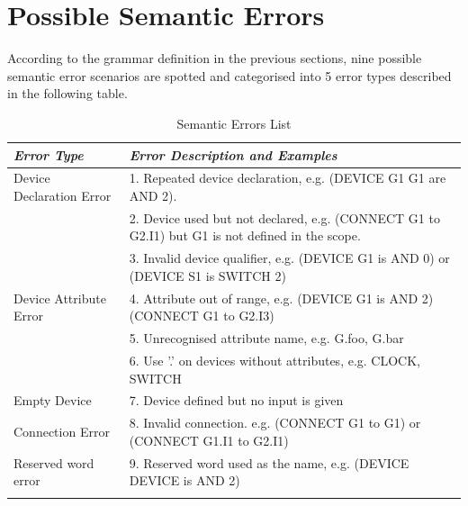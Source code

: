 \documentclass[12pt]{article}
\def\n{\noindent}
\begin{document}
\section{Possible Semantic Errors}
\n According to the grammar definition in the previous sections, nine possible semantic error scenarios are spotted and categorised into 5 error types described in the following table. 
\begin{table}[H]
\centering
\begin{longtable}{p{5cm}p{10cm}}
\textit{Error Type} & {\textit{Error Description and Examples}}\\
\toprule
\addlinespace[0.2cm]
Device Declaration Error & 1. Repeated device declaration, \newline e.g. (DEVICE G1 G1 are AND 2). \\
\addlinespace[0.2cm]
& 2. Device used but not declared, \newline e.g. (CONNECT G1 to G2.I1) but G1 is not defined in the scope.\\
\addlinespace[0.2cm]
& 3. Invalid device qualifier, \newline e.g. (DEVICE G1 is AND 0) or (DEVICE S1 is SWITCH 2)\\
\addlinespace[0.2cm]
\midrule
Device Attribute Error & 4. Attribute out of range, \newline e.g. (DEVICE G1 is AND 2)(CONNECT G1 to G2.I3)\\
\addlinespace[0.2cm]
& 5. Unrecognised attribute name, \newline e.g. G.foo, G.bar\\
\addlinespace[0.2cm]
& 6. Use '.' on devices without attributes, \newline e.g. CLOCK, SWITCH\\
\addlinespace[0.2cm]
\midrule
Empty Device & 7. Device defined but no input is given\\
\addlinespace[0.2cm]
\midrule
Connection Error & 8. Invalid connection. \newline e.g. (CONNECT G1 to G1) or (CONNECT G1.I1 to G2.I1)\\
\addlinespace[0.2cm]
\midrule
Reserved word error & 9. Reserved word used as the name, \newline e.g. (DEVICE DEVICE is AND 2)\\
\addlinespace[0.2cm]
\end{longtable}
\caption{Semantic Errors List}
\end{table}
\end{document}
